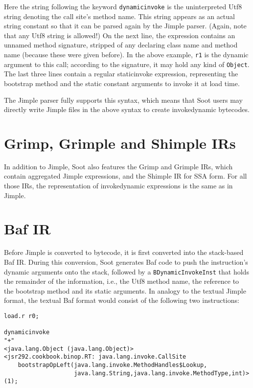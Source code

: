 \documentclass{article}
\newcommand{\id}{invokedynamic\xspace}
\begin{document}
Here the string following the keyword \texttt{dynamicinvoke} is the
uninterpreted Utf8 string denoting the call site's method name. This string
appears as an actual string constant so that it can be parsed again by the
Jimple parser. (Again, note that any Utf8 string is allowed!)
On the next line, the expression contains an unnamed method signature, stripped
of any declaring class name and method name (because these were given before). In
the above example, \texttt{r1} is the dynamic argument to this call;
according to the signature, it may hold any kind of \texttt{Object}. The last three
lines contain a regular staticinvoke expression, representing the bootstrap
method and the static constant arguments to invoke it at load time.

The Jimple parser fully supports this syntax, which means that Soot users may
directly write Jimple files in the above syntax to create invokedynamic
bytecodes.

\section{Grimp, Grimple and Shimple IRs}
In addition to Jimple, Soot also features the Grimp and Grimple IRs, which
contain aggregated Jimple expressions, and the Shimple IR for SSA form. For all
those IRs, the representation of \id expressions is the same as in Jimple.

\section{Baf IR}
Before Jimple is converted to bytecode, it is first converted into the
stack-based Baf IR. During this conversion, Soot generates Baf code to push the
instruction's dynamic arguments onto the stack, followed by a
\texttt{BDynamicInvokeInst} that holds the remainder of the information, i.e.,
the Utf8 method name, the reference to the bootstrap method and its static
arguments. In analogy to the textual Jimple format, the textual Baf format would
consist of the following two instructions:

\begin{verbatim}
load.r r0;

dynamicinvoke
"+"
<java.lang.Object (java.lang.Object)>
<jsr292.cookbook.binop.RT: java.lang.invoke.CallSite
    bootstrapOpLeft(java.lang.invoke.MethodHandles$Lookup,
                    java.lang.String,java.lang.invoke.MethodType,int)>(1);
\end{verbatim}
\end{document}
